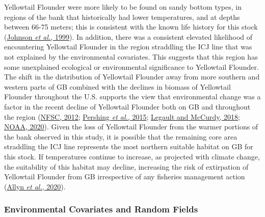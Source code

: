 \documentclass[
]{article}
\begin{document}
Yellowtail Flounder were more likely to be found on sandy bottom types, in regions of the bank that historically had lower temperatures, and at depths between 66-75 meters; this is consistent with the known life history for this stock (\protect\hyperlink{ref-johnsonYellowtailFlounderLimanda1999}{Johnson \emph{et al.}, 1999}). In addition, there was a consistent elevated likelihood of encountering Yellowtail Flounder in the region straddling the ICJ line that was not explained by the environmental covariates. This suggests that this region has some unexplained ecological or environmental significance to Yellowtail Flounder. The shift in the distribution of Yellowtail Flounder away from more southern and western parts of GB combined with the declines in biomass of Yellowtail Flounder throughout the U.S. supports the view that environmental change was a factor in the recent decline of Yellowtail Flounder both on GB and throughout the region (\protect\hyperlink{ref-nfsc54thNortheastRegional2012}{NFSC, 2012}; \protect\hyperlink{ref-pershingSlowAdaptationFace2015}{Pershing \emph{et al.}, 2015}; \protect\hyperlink{ref-legaultStockAssessmentGeorges2018}{Legault and McCurdy, 2018}; \protect\hyperlink{ref-noaaNOAAYellowtailFlounder2020}{NOAA, 2020}). Given the loss of Yellowtail Flounder from the warmer portions of the bank observed in this study, it is possible that the remaining core area straddling the ICJ line represents the most northern suitable habitat on GB for this stock. If temperatures continue to increase, as projected with climate change, the suitability of this habitat may decline, increasing the risk of extirpation of Yellowtail Flounder from GB irrespective of any fisheries management action (\protect\hyperlink{ref-allynComparingSynthesizingQuantitative2020}{Allyn \emph{et al.}, 2020}).

\hypertarget{environmental-covariates-and-random-fields}{%
\subsubsection{Environmental Covariates and Random Fields}\label{environmental-covariates-and-random-fields}}
\end{document}
